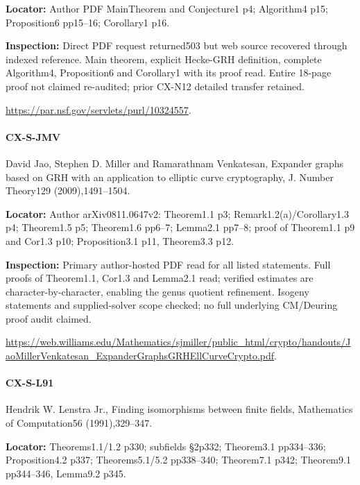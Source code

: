 \documentclass[11pt,a4paper]{article}
\begin{document}
\textbf{Locator:} Author PDF MainTheorem and Conjecture1 p4; Algorithm4 p15; Proposition6 pp15–\allowbreak{}16; Corollary1 p16.

\textbf{Inspection:} Direct PDF request returned503 but web source recovered through indexed reference.\allowbreak{} Main theorem, explicit Hecke-GRH definition, complete Algorithm4, Proposition6 and Corollary1 with its proof read.\allowbreak{} Entire 18-page proof not claimed re-audited; prior CX-N12 detailed transfer retained.\allowbreak{}

\url{https://par.nsf.gov/servlets/purl/10324557}.

\paragraph{CX-S-JMV} David Jao, Stephen D.\allowbreak{} Miller and Ramarathnam Venkatesan, Expander graphs based on GRH with an application to elliptic curve cryptography, J.\allowbreak{} Number Theory129 (2009),1491–\allowbreak{}1504.

\textbf{Locator:} Author arXiv0811.\allowbreak{}0647v2:\allowbreak{} Theorem1.\allowbreak{}1 p3; Remark1.\allowbreak{}2(a)/\allowbreak{}Corollary1.\allowbreak{}3 p4; Theorem1.\allowbreak{}5 p5; Theorem1.\allowbreak{}6 pp6–\allowbreak{}7; Lemma2.\allowbreak{}1 pp7–\allowbreak{}8; proof of Theorem1.\allowbreak{}1 p9 and Cor1.\allowbreak{}3 p10; Proposition3.\allowbreak{}1 p11, Theorem3.\allowbreak{}3 p12.

\textbf{Inspection:} Primary author-hosted PDF read for all listed statements.\allowbreak{} Full proofs of Theorem1.\allowbreak{}1, Cor1.\allowbreak{}3 and Lemma2.\allowbreak{}1 read; verified estimates are character-by-character, enabling the genus quotient refinement.\allowbreak{} Isogeny statements and supplied-solver scope checked; no full underlying CM/\allowbreak{}Deuring proof audit claimed.\allowbreak{}

\url{https://web.williams.edu/Mathematics/sjmiller/public_html/crypto/handouts/JaoMillerVenkatesan_ExpanderGraphsGRHEllCurveCrypto.pdf}.

\paragraph{CX-S-L91} Hendrik W.\allowbreak{} Lenstra Jr.\allowbreak{}, Finding isomorphisms between finite fields, Mathematics of Computation56 (1991),329–\allowbreak{}347.

\textbf{Locator:} Theorems1.\allowbreak{}1/\allowbreak{}1.\allowbreak{}2 p330; subfields §2p332; Theorem3.\allowbreak{}1 pp334–\allowbreak{}336; Proposition4.\allowbreak{}2 p337; Theorems5.\allowbreak{}1/\allowbreak{}5.\allowbreak{}2 pp338–\allowbreak{}340; Theorem7.\allowbreak{}1 p342; Theorem9.\allowbreak{}1 pp344–\allowbreak{}346, Lemma9.\allowbreak{}2 p345.
\end{document}
